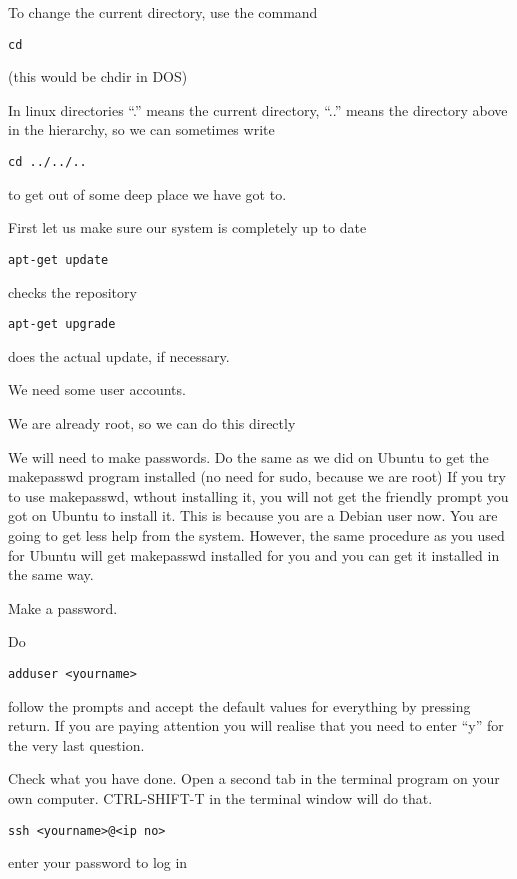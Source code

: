 \documentclass[12pt,a4paper]{article}
\begin{document}
To change the current directory, use the command 
\begin{lstlisting}
cd
\end{lstlisting}
(this would be chdir in DOS)

In linux directories “.” means the current directory, “..” means the directory above in the hierarchy, so we can sometimes write
\begin{lstlisting}
cd ../../..
\end{lstlisting}

to get out of some deep place we have got to.

First let us make sure our system is completely up to date
\begin{lstlisting}
apt-get update
\end{lstlisting}
checks the repository
\begin{lstlisting}
apt-get upgrade
\end{lstlisting}
does the actual update, if necessary.

We need some user accounts.

We are already root, so we can do this directly

We will need to make passwords. Do the same as we did on Ubuntu to get the makepasswd program installed (no need for sudo, because we are root)
If you try to use makepasswd, wthout installing it, you will not get the friendly prompt you got on Ubuntu to install it. This is because you are a Debian user now.  You are going to get less help from the system. However, the same procedure as you used for Ubuntu will get makepasswd installed for you and you can get it installed in the same way.

Make a password.

Do
\begin{lstlisting}
adduser <yourname>
\end{lstlisting}

follow the prompts and accept the default values for everything by pressing return. If you are paying attention you will realise that you need to enter “y” for the very last question.

Check what you have done. Open a second tab in the terminal program on your own computer. CTRL-SHIFT-T in the terminal window will do that.
\begin{lstlisting}
ssh <yourname>@<ip no>
\end{lstlisting}
enter your password to log in
\end{document}
